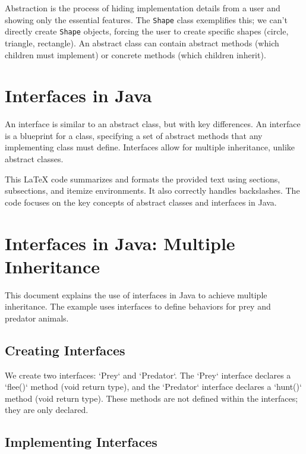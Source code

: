 \documentclass{article}
\begin{document}
Abstraction is the process of hiding implementation details from a user and showing only the essential features. The \texttt{Shape} class exemplifies this; we can't directly create \texttt{Shape} objects, forcing the user to create specific shapes (circle, triangle, rectangle). An abstract class can contain abstract methods (which children must implement) or concrete methods (which children inherit).


\section{Interfaces in Java}

An interface is similar to an abstract class, but with key differences.  An interface is a blueprint for a class, specifying a set of abstract methods that any implementing class must define.  Interfaces allow for multiple inheritance, unlike abstract classes.


This LaTeX code summarizes and formats the provided text using sections, subsections, and itemize environments.  It also correctly handles backslashes.  The code focuses on the key concepts of abstract classes and interfaces in Java.


\section{Interfaces in Java: Multiple Inheritance}

This document explains the use of interfaces in Java to achieve multiple inheritance.  The example uses interfaces to define behaviors for prey and predator animals.

\subsection{Creating Interfaces}

We create two interfaces: `Prey` and `Predator`.  The `Prey` interface declares a `flee()` method (void return type), and the `Predator` interface declares a `hunt()` method (void return type).  These methods are not defined within the interfaces; they are only declared.

\subsection{Implementing Interfaces}
\end{document}
